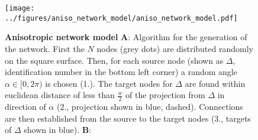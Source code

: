 
\begin{figure}[h]
  \vspace{0.25cm}
  \centering
  \texttt{[image: ../figures/aniso\_network\_model/aniso\_network\_model.pdf]} %
  \vspace{0.1cm}
\caption{{\bf Anisotropic network model} \textbf{A}: Algorithm for the generation of the network. First the $N$ nodes (grey dots) are distributed randomly on the square surface. Then, for each source node (shown as $\Delta$, identification number in the bottom left corner) a random angle $\alpha \in [0,2\pi)$ is chosen (1.). The target nodes for $\Delta$ are found within euclidean distance of less than $\frac{w}{2}$ of the projection from $\Delta$ in direction of $\alpha$ (2., projection shown in blue, dashed). Connections are then established from the source to the target nodes (3., targets of $\Delta$ shown in blue). \textbf{B}:}
\label{fig_model}%
\end{figure}

